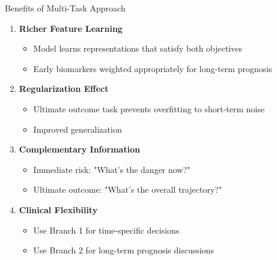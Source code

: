 \documentclass{beamer}
\begin{document}


\begin{frame}{Benefits of Multi-Task Approach}
\begin{enumerate}
    \item \textbf{Richer Feature Learning}
    \begin{itemize}
        \item Model learns representations that satisfy both objectives
        \item Early biomarkers weighted appropriately for long-term prognosis
    \end{itemize}

    \item \textbf{Regularization Effect}
    \begin{itemize}
        \item Ultimate outcome task prevents overfitting to short-term noise
        \item Improved generalization
    \end{itemize}

    \item \textbf{Complementary Information}
    \begin{itemize}
        \item Immediate risk: "What's the danger now?"
        \item Ultimate outcome: "What's the overall trajectory?"
    \end{itemize}

    \item \textbf{Clinical Flexibility}
    \begin{itemize}
        \item Use Branch 1 for time-specific decisions
        \item Use Branch 2 for long-term prognosis discussions
    \end{itemize}
\end{enumerate}
\end{frame}
\end{document}
